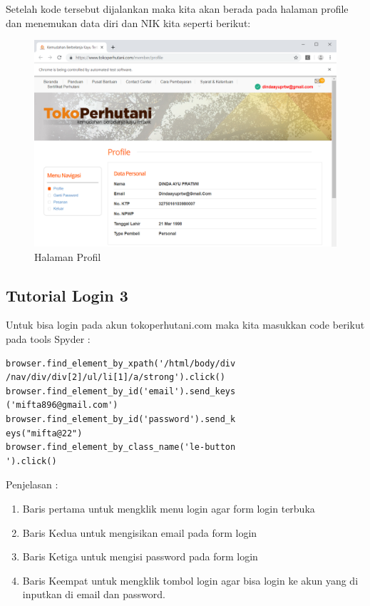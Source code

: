 Setelah kode tersebut dijalankan maka kita akan berada pada halaman profile dan menemukan data diri dan NIK kita seperti berikut:

\begin{figure}[h]
	\centering
	\includegraphics[scale=0.28]{figures/6profile}
	\caption{Halaman Profil}
\end{figure}


\newpage
\subsection{Tutorial Login 3}
Untuk bisa login pada akun tokoperhutani.com maka kita masukkan code berikut pada tools Spyder :
\begin{verbatim}
browser.find_element_by_xpath('/html/body/div
/nav/div/div[2]/ul/li[1]/a/strong').click()
browser.find_element_by_id('email').send_keys
('mifta896@gmail.com')
browser.find_element_by_id('password').send_k
eys("mifta@22")
browser.find_element_by_class_name('le-button
').click()
\end{verbatim}

Penjelasan :
\begin{enumerate}
	\item Baris pertama untuk mengklik menu login agar form login terbuka
	\item Baris Kedua untuk mengisikan email pada form login 
	\item Baris Ketiga untuk mengisi password pada form login
	\item Baris Keempat untuk mengklik tombol login agar bisa login ke akun yang di inputkan di email dan password.
\end{enumerate}

